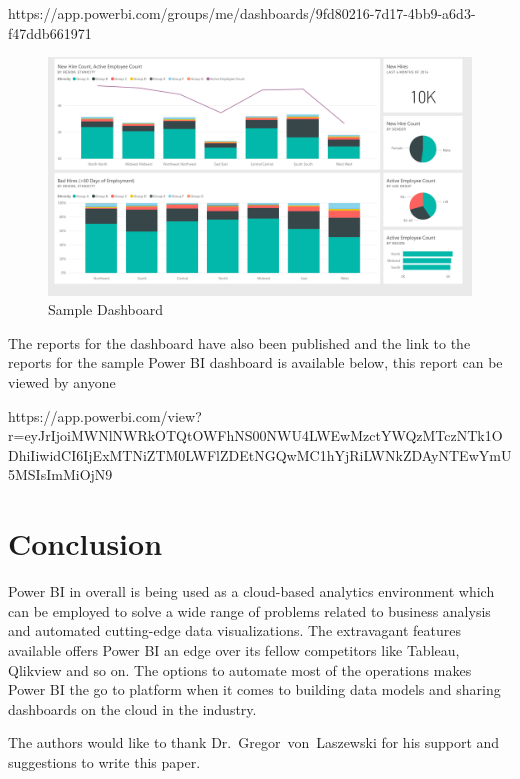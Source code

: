 https://app.powerbi.com/groups/me/dashboards/9fd80216-7d17-4bb9-a6d3-f47ddb661971

\begin{figure}[!ht]
  \centering\includegraphics[width=\columnwidth]{../image/dashboard.png}
  \caption{Sample Dashboard}\label{f:Dashboard}
\end{figure}

The reports for the dashboard have also been published and the link to the 
reports for the sample Power BI dashboard is available below, this report 
can be viewed by anyone 

https://app.powerbi.com/view?r=eyJrIjoiMWNlNWRkOTQtOWFhNS00NWU4LWEwMzctYWQzMTczNTk1ODhiIiwidCI6IjExMTNiZTM0LWFlZDEtNGQwMC1hYjRiLWNkZDAyNTEwYmU5MSIsImMiOjN9
 
\section{Conclusion}
Power BI in overall is being used as a cloud-based analytics environment which 
can be employed to solve a wide range of problems related to business analysis 
and automated cutting-edge data visualizations. The extravagant features 
available offers Power BI an edge over its fellow competitors like Tableau, 
Qlikview and so on. The options to automate most of the operations makes 
Power BI the go to platform when it comes to building data models and sharing 
dashboards on the cloud in the industry.
 
\begin{acks}

The authors would like to thank Dr.~Gregor~von~Laszewski for his
support and suggestions to write this paper.

\end{acks}


 